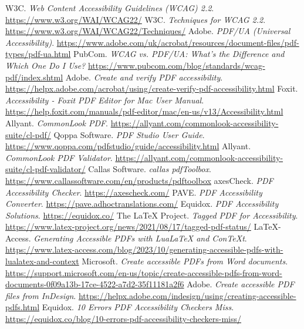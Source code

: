 \begin{thebibliography}{99}
 W3C. \textit{Web Content Accessibility Guidelines (WCAG) 2.2}. \url{https://www.w3.org/WAI/WCAG22/}
 W3C. \textit{Techniques for WCAG 2.2}. \url{https://www.w3.org/WAI/WCAG22/Techniques/}
 Adobe. \textit{PDF/UA (Universal Accessibility)}. \url{https://www.adobe.com/uk/acrobat/resources/document-files/pdf-types/pdf-ua.html}
 PubCom. \textit{WCAG vs. PDF/UA: What's the Difference and Which One Do I Use?} \url{https://www.pubcom.com/blog/standards/wcag-pdf/index.shtml}
 Adobe. \textit{Create and verify PDF accessibility}. \url{https://helpx.adobe.com/acrobat/using/create-verify-pdf-accessibility.html}
 Foxit. \textit{Accessibility - Foxit PDF Editor for Mac User Manual}. \url{https://help.foxit.com/manuals/pdf-editor/mac/en-us/v13/Accessibility.html}
 Allyant. \textit{CommonLook PDF}. \url{https://allyant.com/commonlook-accessibility-suite/cl-pdf/}
 Qoppa Software. \textit{PDF Studio User Guide}. \url{https://www.qoppa.com/pdfstudio/guide/accessibility.html}
 Allyant. \textit{CommonLook PDF Validator}. \url{https://allyant.com/commonlook-accessibility-suite/cl-pdf-validator/}
 Callas Software. \textit{callas pdfToolbox}. \url{https://www.callassoftware.com/en/products/pdftoolbox}
 axesCheck. \textit{PDF Accessibility Checker}. \url{https://axescheck.com/}
 PAVE. \textit{PDF Accessibility Converter}. \url{https://pave.adhoctranslations.com/}
 Equidox. \textit{PDF Accessibility Solutions}. \url{https://equidox.co/}
 The LaTeX Project. \textit{Tagged PDF for Accessibility}. \url{https://www.latex-project.org/news/2021/08/17/tagged-pdf-status/}
 LaTeX-Access. \textit{Generating Accessible PDFs with LuaLaTeX and ConTeXt}. \url{https://www.latex-access.com/blog/2023/10/generating-accessible-pdfs-with-lualatex-and-context}
 Microsoft. \textit{Create accessible PDFs from Word documents}. \url{https://support.microsoft.com/en-us/topic/create-accessible-pdfs-from-word-documents-0f09a13b-17ce-4522-a7d2-35f11181a2f6}
 Adobe. \textit{Create accessible PDF files from InDesign}. \url{https://helpx.adobe.com/indesign/using/creating-accessible-pdfs.html}
 Equidox. \textit{10 Errors PDF Accessibility Checkers Miss}. \url{https://equidox.co/blog/10-errors-pdf-accessibility-checkers-miss/}
\end{thebibliography}
